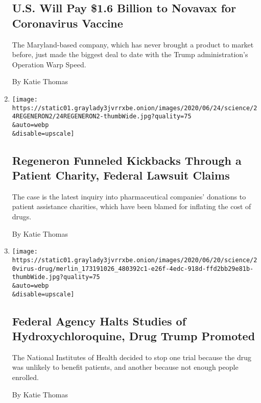 \begin{enumerate}
{  \subsection{U.S. Will Pay \$1.6 Billion to Novavax for Coronavirus
  Vaccine}\label{us-will-pay-16-billion-to-novavax-for-coronavirus-vaccine}}

  The Maryland-based company, which has never brought a product to
  market before, just made the biggest deal to date with the Trump
  administration's Operation Warp Speed.

  By Katie Thomas
\item
  \href{/2020/06/24/health/drug-kickbacks-regeneron.html}{}

  \texttt{[image: https://static01.graylady3jvrrxbe.onion/images/2020/06/24/science/24REGENERON2/24REGENERON2-thumbWide.jpg?quality=75\\\&auto=webp\\\&disable=upscale]}

  \hypertarget{regeneron-funneled-kickbacks-through-a-patient-charity-federal-lawsuit-claims}{%
  \subsection{Regeneron Funneled Kickbacks Through a Patient Charity,
  Federal Lawsuit
  Claims}\label{regeneron-funneled-kickbacks-through-a-patient-charity-federal-lawsuit-claims}}

  The case is the latest inquiry into pharmaceutical companies'
  donations to patient assistance charities, which have been blamed for
  inflating the cost of drugs.

  By Katie Thomas
\item
  \href{/2020/06/20/health/hydroxychloroquine-coronavirus-trial.html}{}

  \texttt{[image: https://static01.graylady3jvrrxbe.onion/images/2020/06/20/science/20virus-drug/merlin\_173191026\_480392c1-e26f-4edc-918d-ffd2bb29e81b-thumbWide.jpg?quality=75\\\&auto=webp\\\&disable=upscale]}

  \hypertarget{federal-agency-halts-studies-of-hydroxychloroquine-drug-trump-promoted}{%
  \subsection{Federal Agency Halts Studies of Hydroxychloroquine, Drug
  Trump
  Promoted}\label{federal-agency-halts-studies-of-hydroxychloroquine-drug-trump-promoted}}

  The National Institutes of Health decided to stop one trial because
  the drug was unlikely to benefit patients, and another because not
  enough people enrolled.

  By Katie Thomas
\end{enumerate}

